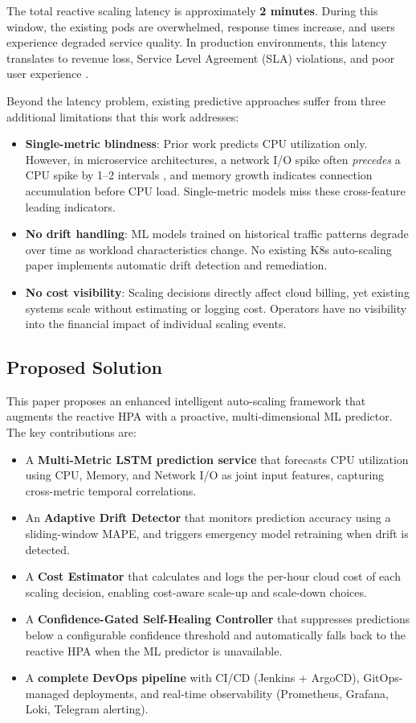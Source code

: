 \documentclass[journal]{IEEEtran}
\begin{document}
The total reactive scaling latency is approximately \textbf{2 minutes}. During this window, the existing pods are overwhelmed, response times increase, and users experience degraded service quality. In production environments, this latency translates to revenue loss, Service Level Agreement (SLA) violations, and poor user experience \cite{mao2016}.

Beyond the latency problem, existing predictive approaches suffer from three additional limitations that this work addresses:

\begin{itemize}
    \item \textbf{Single-metric blindness}: Prior work predicts CPU utilization only. However, in microservice architectures, a network I/O spike often \textit{precedes} a CPU spike by 1--2 intervals \cite{dangquang2021}, and memory growth indicates connection accumulation before CPU load. Single-metric models miss these cross-feature leading indicators.
    \item \textbf{No drift handling}: ML models trained on historical traffic patterns degrade over time as workload characteristics change. No existing K8s auto-scaling paper implements automatic drift detection and remediation.
    \item \textbf{No cost visibility}: Scaling decisions directly affect cloud billing, yet existing systems scale without estimating or logging cost. Operators have no visibility into the financial impact of individual scaling events.
\end{itemize}

\subsection{Proposed Solution}
This paper proposes an enhanced intelligent auto-scaling framework that augments the reactive HPA with a proactive, multi-dimensional ML predictor. The key contributions are:

\begin{itemize}
    \item A \textbf{Multi-Metric LSTM prediction service} that forecasts CPU utilization using CPU, Memory, and Network I/O as joint input features, capturing cross-metric temporal correlations.
    \item An \textbf{Adaptive Drift Detector} that monitors prediction accuracy using a sliding-window MAPE, and triggers emergency model retraining when drift is detected.
    \item A \textbf{Cost Estimator} that calculates and logs the per-hour cloud cost of each scaling decision, enabling cost-aware scale-up and scale-down choices.
    \item A \textbf{Confidence-Gated Self-Healing Controller} that suppresses predictions below a configurable confidence threshold and automatically falls back to the reactive HPA when the ML predictor is unavailable.
    \item A \textbf{complete DevOps pipeline} with CI/CD (Jenkins + ArgoCD), GitOps-managed deployments, and real-time observability (Prometheus, Grafana, Loki, Telegram alerting).
\end{itemize}
\end{document}
